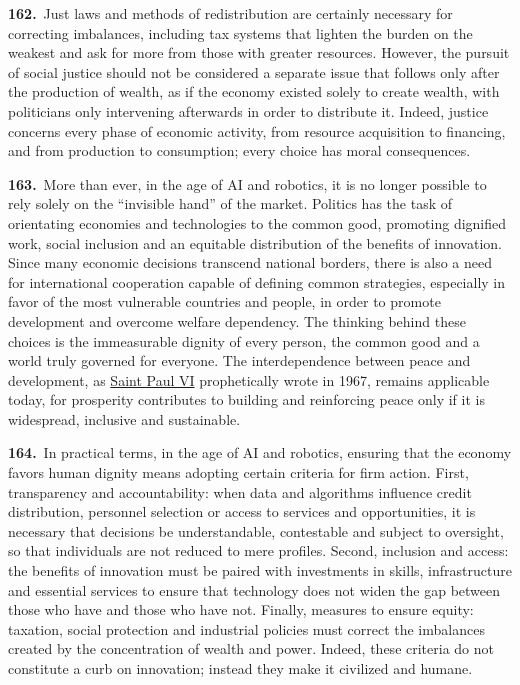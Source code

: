 \documentclass{article}
\begin{document}
\textbf{162.}\ Just laws and methods of redistribution are certainly necessary for correcting imbalances, including tax systems that lighten the burden on the weakest and ask for more from those with greater resources. However, the pursuit of social justice should not be considered a separate issue that follows only after the production of wealth, as if the economy existed solely to create wealth, with politicians only intervening afterwards in order to distribute it. Indeed, justice concerns every phase of economic activity, from resource acquisition to financing, and from production to consumption; every choice has moral consequences.\cite{n163}

\textbf{163.}\ More than ever, in the age of AI and robotics, it is no longer possible to rely solely on the ``invisible hand'' of the market.\cite{n164} Politics has the task of orientating economies and technologies to the common good, promoting dignified work, social inclusion and an equitable distribution of the benefits of innovation. Since many economic decisions transcend national borders, there is also a need for international cooperation capable of defining common strategies, especially in favor of the most vulnerable countries and people, in order to promote development and overcome welfare dependency. The thinking behind these choices is the immeasurable dignity of every person, the common good and a world truly governed for everyone. The interdependence between peace and development, as \href{https://www.vatican.va/content/paul-vi/en.html}{Saint Paul VI} prophetically wrote in 1967,\cite{n165} remains applicable today, for prosperity contributes to building and reinforcing peace only if it is widespread, inclusive and sustainable.

\textbf{164.}\ In practical terms, in the age of AI and robotics, ensuring that the economy favors human dignity means adopting certain criteria for firm action. First, transparency and accountability: when data and algorithms influence credit distribution, personnel selection or access to services and opportunities, it is necessary that decisions be understandable, contestable and subject to oversight, so that individuals are not reduced to mere profiles. Second, inclusion and access: the benefits of innovation must be paired with investments in skills, infrastructure and essential services to ensure that technology does not widen the gap between those who have and those who have not. Finally, measures to ensure equity: taxation, social protection and industrial policies must correct the imbalances created by the concentration of wealth and power. Indeed, these criteria do not constitute a curb on innovation; instead they make it civilized and humane.
\end{document}
